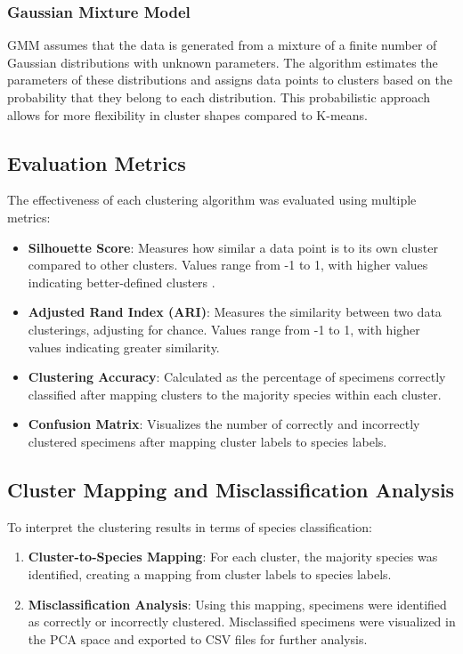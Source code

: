 \documentclass[a4paper,12pt]{report}
\begin{document}
\subsubsection{Gaussian Mixture Model}

GMM assumes that the data is generated from a mixture of a finite number of Gaussian distributions with unknown parameters. The algorithm estimates the parameters of these distributions and assigns data points to clusters based on the probability that they belong to each distribution. This probabilistic approach allows for more flexibility in cluster shapes compared to K-means.

\subsection{Evaluation Metrics}
The effectiveness of each clustering algorithm was evaluated using multiple metrics:

\begin{itemize}
    \item \textbf{Silhouette Score}: Measures how similar a data point is to its own cluster compared to other clusters. Values range from -1 to 1, with higher values indicating better-defined clusters \citep{ROUSSEEUW198753}.
    \item \textbf{Adjusted Rand Index (ARI)}: Measures the similarity between two data clusterings, adjusting for chance. Values range from -1 to 1, with higher values indicating greater similarity.
    \item \textbf{Clustering Accuracy}: Calculated as the percentage of specimens correctly classified after mapping clusters to the majority species within each cluster.
    \item \textbf{Confusion Matrix}: Visualizes the number of correctly and incorrectly clustered specimens after mapping cluster labels to species labels.
\end{itemize}

\subsection{Cluster Mapping and Misclassification Analysis}
To interpret the clustering results in terms of species classification:
\begin{enumerate}
    \item \textbf{Cluster-to-Species Mapping}: For each cluster, the majority species was identified, creating a mapping from cluster labels to species labels.
    \item \textbf{Misclassification Analysis}: Using this mapping, specimens were identified as correctly or incorrectly clustered. Misclassified specimens were visualized in the PCA space and exported to CSV files for further analysis.
\end{enumerate}
\end{document}
